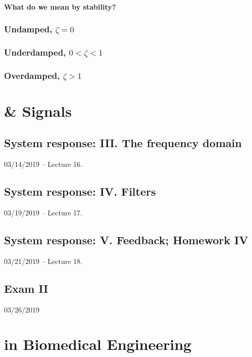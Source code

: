 \documentclass[11pt]{book}
\begin{document}
\subsection{What do we mean by stability?}
\section{Undamped, $\zeta = 0$}
\section{Underdamped, $0 < \zeta < 1$}
\section{Overdamped, $\zeta > 1$}



\part{\& Signals}



\chapter{System response: III. The frequency domain}
03/14/2019 – Lecture 16. 



\chapter{System response: IV. Filters}
03/19/2019 – Lecture 17. 



\chapter{System response: V. Feedback; Homework IV}
03/21/2019 – Lecture 18. 



\chapter*{Exam II}
03/26/2019



\part{in Biomedical Engineering}
\end{document}
